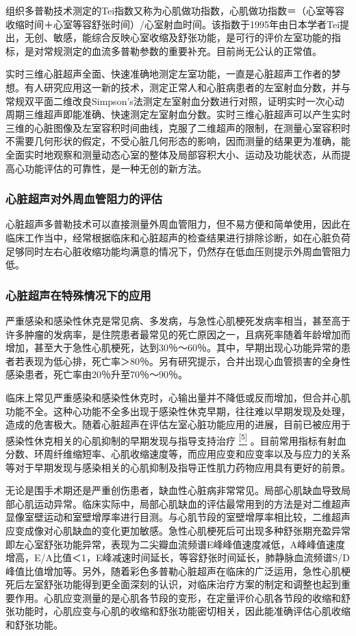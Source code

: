 组织多普勒技术测定的Tei指数又称为心肌做功指数，心肌做功指数＝（心室等容收缩时间＋心室等容舒张时间）/心室射血时间。该指数于1995年由日本学者Tei提出，无创、敏感，能综合反映心室收缩及舒张功能，是可行的评价左室功能的指标，是对常规测定的血流多普勒参数的重要补充。目前尚无公认的正常值。

实时三维心脏超声全面、快速准确地测定左室功能，一直是心脏超声工作者的梦想。有人研究应用这一新的技术，测定正常人和心脏病患者的左室射血分数，并与常规双平面二维改良Simpson's法测定左室射血分数进行对照，证明实时一次心动周期三维超声即能准确、快速测定左室射血分数。实时三维心脏超声可以产生实时三维的心脏图像及左室容积时间曲线，克服了二维超声的限制，在测量心室容积时不需要几何形状的假定，不受心脏几何形态的影响，因而测量的结果更为准确，能全面实时地观察和测量动态心室的整体及局部容积大小、运动及功能状态，从而提高心功能评估的可靠性，是一种无创的新方法。

\subsubsection{心脏超声对外周血管阻力的评估}

心脏超声多普勒技术可以直接测量外周血管阻力，但不易方便和简单使用，因此在临床工作当中，经常根据临床和心脏超声的检查结果进行排除诊断，如在心脏负荷足够同时左右心脏收缩功能均满意的情况下，仍然存在低血压则提示外周血管阻力低。

\subsubsection{心脏超声在特殊情况下的应用}

严重感染和感染性休克是常见病、多发病，与急性心肌梗死发病率相当，甚至高于许多肿瘤的发病率，是住院患者最常见的死亡原因之一，且病死率随着年龄增加而增加，甚至大于急性心肌梗死，达到30％～60％。其中，早期出现心功能异常的患者若表现为低心排，死亡率＞80％。另有研究提示，合并出现心血管损害的全身性感染患者，死亡率由20％升至70％～90％。

临床上常见严重感染和感染性休克时，心输出量并不降低或反而增加，但合并心肌功能不全。这种心功能不全多出现于感染性休克早期，往往难以早期发现及处理，造成的危害极大。随着心脏超声在评估左室心脏功能应用的进展，目前已被应用于感染性休克相关的心肌抑制的早期发现与指导支持治疗
\protect\hyperlink{text00009.htmlux5cux23ch5-8}{\textsuperscript{{[}5{]}}}
。目前常用指标有射血分数、环周纤维缩短率、心肌收缩速度等，而应用应变和应变率以及与应力的关系等对于早期发现与感染相关的心肌抑制及指导正性肌力药物应用具有更好的前景。

无论是围手术期还是严重创伤患者，缺血性心脏病非常常见。局部心肌缺血导致局部心肌运动异常。临床实际中，局部心肌缺血的评估最常用到的方法是对二维超声显像室壁运动和室壁增厚率进行目测。与心肌节段的室壁增厚率相比较，二维超声应变成像对心肌缺血的变化更加敏感。急性心肌梗死后可出现多种舒张期充盈异常即左心室舒张功能异常，表现为二尖瓣血流频谱E峰峰值速度减低，A峰峰值速度增高，E/A比值＜1，E峰减速时间延长，等容舒张时间延长，肺静脉血流频谱S/D峰值比值增加等。另外，随着彩色多普勒心脏超声在临床的广泛运用，急性心肌梗死后左室舒张功能得到更全面深刻的认识，对临床治疗方案的制定和调整也起到重要作用。心肌应变测量的是心肌各节段的变形，在定量评价心肌各节段的收缩和舒张功能时，心肌应变与心肌的收缩和舒张功能密切相关，因此能准确评估心肌收缩和舒张功能。

